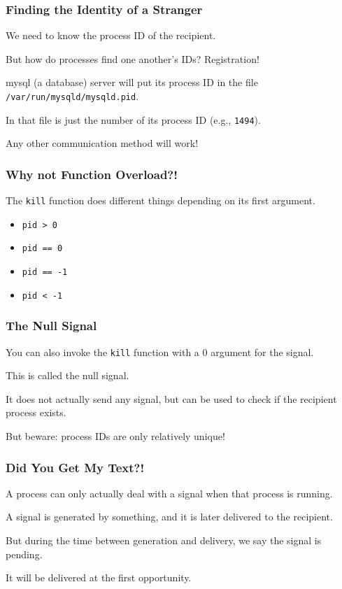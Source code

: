 \begin{frame}
	\frametitle{Finding the Identity of a Stranger}

	We need to know the process ID of the recipient.

	But how do processes find one another's IDs? Registration!

	mysql (a database) server will put its process ID in the file \texttt{/var/run/mysqld/mysqld.pid}.

	In that file is just the number of its process ID (e.g., \texttt{1494}).

	Any other communication method will work!

\end{frame}


\begin{frame}
	\frametitle{Why not Function Overload?!}

	The \texttt{kill} function does different things depending on its first argument.

	\begin{itemize}
		\item \texttt{pid > 0}
		\item \texttt{pid == 0}
		\item \texttt{pid == -1}
		\item \texttt{pid < -1}
	\end{itemize}

\end{frame}

\begin{frame}
	\frametitle{The Null Signal}

	You can also invoke the \texttt{kill} function with a 0 argument for the signal.

	This is called the \alert{null signal}.

	It does not actually send any signal, but can be used to check if the recipient process exists.

	But beware: process IDs are only relatively unique!

\end{frame}


\begin{frame}
	\frametitle{Did You Get My Text?!}

	A process can only actually deal with a signal when that process is running.

	A signal is generated by something, and it is later delivered to the recipient.

	But during the time between generation and delivery, we say the signal is \alert{pending}.

	It will be delivered at the first opportunity.

\end{frame}


